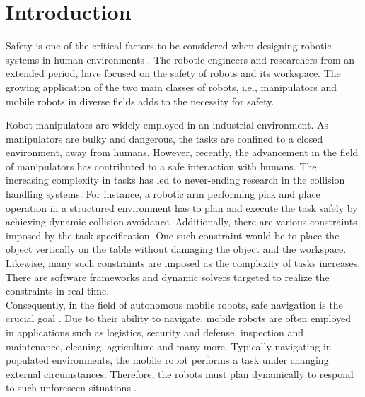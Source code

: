 

	

\chapter{Introduction}

Safety is one of the critical factors to be considered when designing robotic systems in human environments \cite{shin2008hybrid}. The robotic engineers and researchers from an extended period, have focused on the safety of robots and its workspace. The growing application of the two main classes of robots, i.e., manipulators and mobile robots in diverse fields adds to the necessity for safety. 


Robot manipulators are widely employed in an industrial environment. As manipulators are bulky and dangerous, the tasks are confined to a closed environment, away from humans. However, recently, the advancement in the field of manipulators has contributed to a safe interaction with humans. The increasing complexity in tasks has led to never-ending research in the collision handling systems. For instance, a robotic arm performing pick and place operation in a structured environment has to plan and execute the task safely by achieving dynamic collision avoidance.
Additionally, there are various constraints imposed by the task specification. One such constraint would be to place the object vertically on the table without damaging the object and the workspace. Likewise, many such constraints are imposed as the complexity of tasks increases. There are software frameworks and dynamic solvers targeted to realize the constraints in real-time. \\

Consequently, in the field of autonomous mobile robots, safe navigation is the crucial goal \cite{fox1997dynamic}. Due to their ability to navigate, mobile robots are often employed in applications such as logistics, security and defense, inspection and maintenance, cleaning, agriculture and many more. Typically navigating in populated environments, the mobile robot performs a task under changing external circumstances. Therefore, the robots must plan dynamically to respond to such unforeseen situations \cite{fox1997dynamic}. \\

